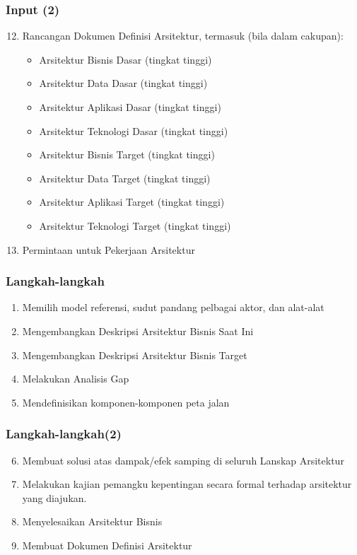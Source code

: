 \documentclass[aspectratio=169, table]{beamer}
\begin{document}
	\begin{frame}
		\frametitle{Input (2)}
		\begin{enumerate}
			\setcounter{enumi}{11}
			\item Rancangan Dokumen Definisi Arsitektur, termasuk (bila dalam cakupan):
			\begin{itemize}
				\item Arsitektur Bisnis Dasar (tingkat tinggi)
				\item Arsitektur Data Dasar (tingkat tinggi)
				\item Arsitektur Aplikasi Dasar (tingkat tinggi)
				\item Arsitektur Teknologi Dasar (tingkat tinggi)
				\item Arsitektur Bisnis Target (tingkat tinggi)
				\item Arsitektur Data Target (tingkat tinggi)
				\item Arsitektur Aplikasi Target (tingkat tinggi)
				\item Arsitektur Teknologi Target (tingkat tinggi)
			\end{itemize}
				\item Permintaan untuk Pekerjaan Arsitektur
		\end{enumerate}
	\end{frame}

	\begin{frame}
		\frametitle{Langkah-langkah}
		\begin{enumerate}
			\item Memilih model referensi, sudut pandang pelbagai aktor, dan alat-alat
			\item Mengembangkan Deskripsi Arsitektur Bisnis Saat Ini
			\item Mengembangkan Deskripsi Arsitektur Bisnis Target
			\item Melakukan Analisis Gap
			\item Mendefinisikan komponen-komponen peta jalan
		\end{enumerate}


	\end{frame}

	\begin{frame}
		\frametitle{Langkah-langkah(2)}
		\begin{enumerate}
			\setcounter{enumi}{5}
			\item Membuat solusi atas dampak/efek samping di seluruh Lanskap Arsitektur
			\item Melakukan kajian pemangku kepentingan secara formal terhadap arsitektur yang diajukan.
			\item Menyelesaikan Arsitektur Bisnis
			\item Membuat Dokumen Definisi Arsitektur
		\end{enumerate}


	\end{frame}
\end{document}
